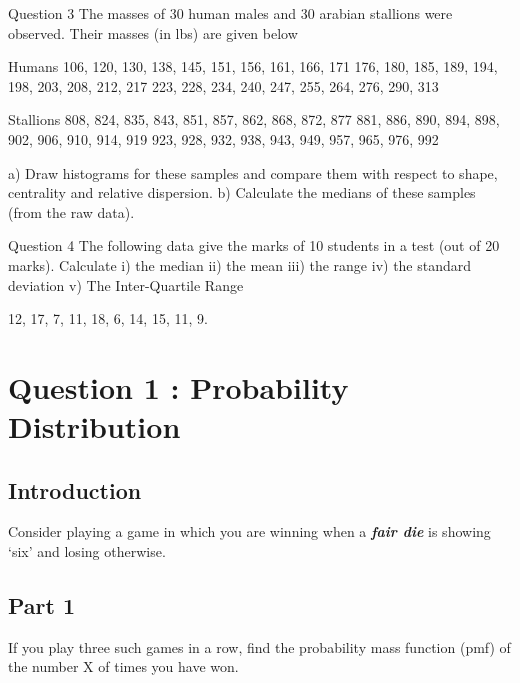 \documentclass[12pt]{report}
\begin{document}
Question 3
The masses of 30 human males and 30 arabian stallions were observed. Their masses (in lbs) are given below

Humans
106, 120, 130, 138, 145, 151, 156, 161, 166, 171
176, 180, 185, 189, 194, 198, 203, 208, 212, 217
223, 228, 234, 240, 247, 255, 264, 276, 290, 313



Stallions
808, 824, 835, 843, 851, 857, 862, 868, 872, 877
881, 886, 890, 894, 898, 902, 906, 910, 914, 919
923, 928, 932, 938, 943, 949, 957, 965, 976, 992


a)	Draw histograms for these samples and compare them with respect to shape, centrality and relative dispersion. 
b)	Calculate the medians of these samples (from the raw data).



Question 4
The following data give the marks of 10 students in a test (out of 20 marks). Calculate
i) the median    ii) the mean     iii) the range    iv) the standard deviation v) The Inter-Quartile Range

12, 17, 7, 11, 18, 6, 14, 15, 11, 9.



\section*{Question 1 : Probability Distribution}

\subsection*{Introduction}{\LARGE Consider playing a game in which you are winning when a \textbf{\emph{fair die}} is showing `six'
	and losing otherwise.}
\subsection*{Part 1}{\LARGE If you play three such games in a row, find the probability mass function (pmf) of the number
	X of times you have won.}
\end{document}

